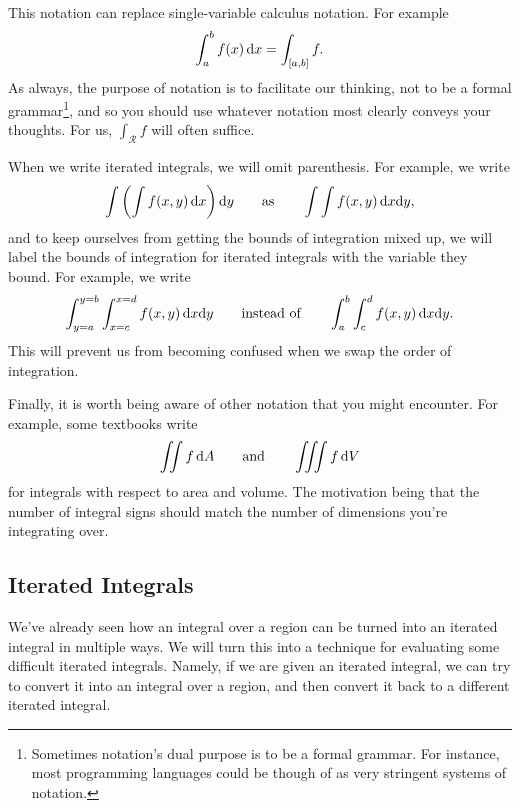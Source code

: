 This notation can replace single-variable calculus notation.  For example
\[
	\int_a^b f(x)\,\mathrm{d} x = \int_{[a,b]} f.
\]
As always, the purpose of notation is to facilitate our thinking, not to be a formal grammar\footnote{
	Sometimes notation's dual purpose is to be a formal grammar.  For instance,
	most programming languages could be though of as very stringent 
	systems of notation.}, and so you should use whatever notation
most clearly conveys your thoughts.  For us, $\int_{\mathcal R}f$ will often suffice.

When we write iterated integrals, we will omit parenthesis.  For example, we write
\[
	\int \left(\int f(x,y)\,\mathrm{d} x\right)\mathrm{d} y\qquad\text{as}\qquad \int \int f(x,y)\,\mathrm{d} x\mathrm{d} y,
\]
and to keep ourselves from getting the bounds of integration mixed up, we will label
the bounds of integration for iterated integrals with the variable they bound.  For example,
we write
\[
	\int_{y=a}^{y=b}\int_{x=c}^{x=d} f(x,y)\,\mathrm{d} x\mathrm{d} y\qquad\text{instead of}\qquad
	\int_{a}^{b}\int_{c}^{d} f(x,y)\,\mathrm{d} x\mathrm{d} y.
\]
This will prevent us from becoming confused when we swap the order of integration.

Finally, it is worth being aware of other notation that you might encounter.  For example,
some textbooks write
\[
	\iint f\,\mathrm{d} A\qquad\text{and}\qquad \iiint f\,\mathrm{d} V
\]
for integrals with respect to area and volume.  The motivation being that the number of integral
signs should match the number of dimensions you're integrating over.

\subsection{Iterated Integrals}

We've already seen how an integral over a region can be turned into an iterated
integral in multiple ways.  We will turn this into a technique for evaluating
some difficult iterated integrals.  Namely, if we are given an iterated integral,
we can try to convert it into an integral over a region, and then convert it back to a different
iterated integral.

